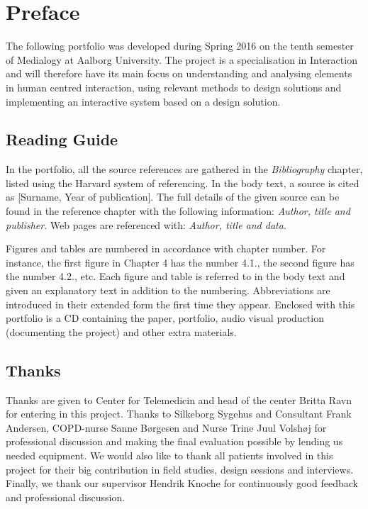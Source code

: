 \chapter{Preface}

The following portfolio was developed during Spring 2016 on the tenth semester of Medialogy at Aalborg University. The project is a specialisation in Interaction and will therefore have its main focus on understanding and analysing elements in human centred interaction, using relevant methods to design solutions and implementing an interactive system based on a design solution.

\section*{Reading Guide}
In the portfolio, all the source references are gathered in the \textit{Bibliography} chapter, listed using the Harvard system of referencing. In the body text, a source is cited as [Surname, Year of publication]. The full details of the given source can be found in the reference chapter with the following information: \textit{Author, title and publisher}. Web pages are referenced with: \textit{Author, title and data}.

Figures and tables are numbered in accordance with chapter number. For instance, the first figure in Chapter 4 has the number 4.1., the second figure has the number 4.2., etc. Each figure and table is referred to in the body text and given an explanatory text in addition to the numbering. Abbreviations are introduced in their extended form the first time they appear. Enclosed with this portfolio is a CD containing the paper, portfolio, audio visual production (documenting the project) and other extra materials. 

\section*{Thanks}
Thanks are given to Center for Telemedicin and head of the center Britta Ravn for entering in this project. Thanks to Silkeborg Sygehus and Consultant Frank Andersen, COPD-nurse Sanne B{\o}rgesen and Nurse Trine Juul Volsh{\o}j for professional discussion and making the final evaluation possible by lending us needed equipment. We would also like to thank all patients involved in this project for their big contribution in field studies, design sessions and interviews. 
Finally, we thank our supervisor Hendrik Knoche for continuously good feedback and professional discussion.